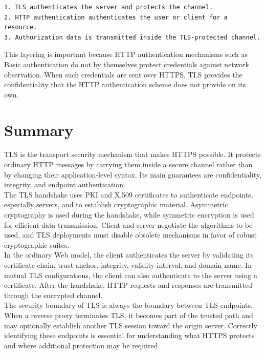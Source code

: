 \documentclass{scrbook}
\begin{document}
\begin{lstlisting}
1. TLS authenticates the server and protects the channel.
2. HTTP authentication authenticates the user or client for a resource.
3. Authorization data is transmitted inside the TLS-protected channel.
\end{lstlisting}

This layering is important because HTTP authentication mechanisms such as Basic authentication do not by themselves protect credentials against network observation. When such credentials are sent over HTTPS, TLS provides the confidentiality that the HTTP authentication scheme does not provide on its own.

\section{Summary}

TLS is the transport security mechanism that makes HTTPS possible. It protects ordinary HTTP messages by carrying them inside a secure channel rather than by changing their application-level syntax. Its main guarantees are confidentiality, integrity, and endpoint authentication.\\

The TLS handshake uses PKI and X.509 certificates to authenticate endpoints, especially servers, and to establish cryptographic material. Asymmetric cryptography is used during the handshake, while symmetric encryption is used for efficient data transmission. Client and server negotiate the algorithms to be used, and TLS deployments must disable obsolete mechanisms in favor of robust cryptographic suites.\\

In the ordinary Web model, the client authenticates the server by validating its certificate chain, trust anchor, integrity, validity interval, and domain name. In mutual TLS configurations, the client can also authenticate to the server using a certificate. After the handshake, HTTP requests and responses are transmitted through the encrypted channel.\\

The security boundary of TLS is always the boundary between TLS endpoints. When a reverse proxy terminates TLS, it becomes part of the trusted path and may optionally establish another TLS session toward the origin server. Correctly identifying these endpoints is essential for understanding what HTTPS protects and where additional protection may be required.
\end{document}
